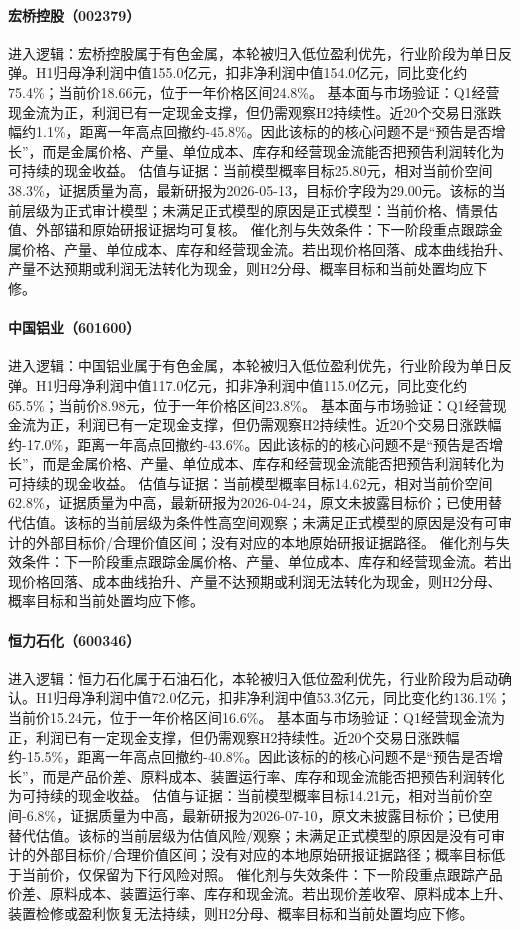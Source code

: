 \paragraph{宏桥控股（002379）}
进入逻辑：宏桥控股属于有色金属，本轮被归入低位盈利优先，行业阶段为单日反弹。H1归母净利润中值155.0亿元，扣非净利润中值154.0亿元，同比变化约75.4\%；当前价18.66元，位于一年价格区间24.8\%。
基本面与市场验证：Q1经营现金流为正，利润已有一定现金支撑，但仍需观察H2持续性。近20个交易日涨跌幅约1.1\%，距离一年高点回撤约-45.8\%。因此该标的的核心问题不是“预告是否增长”，而是金属价格、产量、单位成本、库存和经营现金流能否把预告利润转化为可持续的现金收益。
估值与证据：当前模型概率目标25.80元，相对当前价空间38.3\%，证据质量为高，最新研报为2026-05-13，目标价字段为29.00元。该标的当前层级为正式审计模型；未满足正式模型的原因是正式模型：当前价格、情景估值、外部锚和原始研报证据均可复核。
催化剂与失效条件：下一阶段重点跟踪金属价格、产量、单位成本、库存和经营现金流。若出现价格回落、成本曲线抬升、产量不达预期或利润无法转化为现金，则H2分母、概率目标和当前处置均应下修。

\paragraph{中国铝业（601600）}
进入逻辑：中国铝业属于有色金属，本轮被归入低位盈利优先，行业阶段为单日反弹。H1归母净利润中值117.0亿元，扣非净利润中值115.0亿元，同比变化约65.5\%；当前价8.98元，位于一年价格区间23.8\%。
基本面与市场验证：Q1经营现金流为正，利润已有一定现金支撑，但仍需观察H2持续性。近20个交易日涨跌幅约-17.0\%，距离一年高点回撤约-43.6\%。因此该标的的核心问题不是“预告是否增长”，而是金属价格、产量、单位成本、库存和经营现金流能否把预告利润转化为可持续的现金收益。
估值与证据：当前模型概率目标14.62元，相对当前价空间62.8\%，证据质量为中高，最新研报为2026-04-24，原文未披露目标价；已使用替代估值。该标的当前层级为条件性高空间观察；未满足正式模型的原因是没有可审计的外部目标价/合理价值区间；没有对应的本地原始研报证据路径。
催化剂与失效条件：下一阶段重点跟踪金属价格、产量、单位成本、库存和经营现金流。若出现价格回落、成本曲线抬升、产量不达预期或利润无法转化为现金，则H2分母、概率目标和当前处置均应下修。

\paragraph{恒力石化（600346）}
进入逻辑：恒力石化属于石油石化，本轮被归入低位盈利优先，行业阶段为启动确认。H1归母净利润中值72.0亿元，扣非净利润中值53.3亿元，同比变化约136.1\%；当前价15.24元，位于一年价格区间16.6\%。
基本面与市场验证：Q1经营现金流为正，利润已有一定现金支撑，但仍需观察H2持续性。近20个交易日涨跌幅约-15.5\%，距离一年高点回撤约-40.8\%。因此该标的的核心问题不是“预告是否增长”，而是产品价差、原料成本、装置运行率、库存和现金流能否把预告利润转化为可持续的现金收益。
估值与证据：当前模型概率目标14.21元，相对当前价空间-6.8\%，证据质量为中高，最新研报为2026-07-10，原文未披露目标价；已使用替代估值。该标的当前层级为估值风险/观察；未满足正式模型的原因是没有可审计的外部目标价/合理价值区间；没有对应的本地原始研报证据路径；概率目标低于当前价，仅保留为下行风险对照。
催化剂与失效条件：下一阶段重点跟踪产品价差、原料成本、装置运行率、库存和现金流。若出现价差收窄、原料成本上升、装置检修或盈利恢复无法持续，则H2分母、概率目标和当前处置均应下修。

